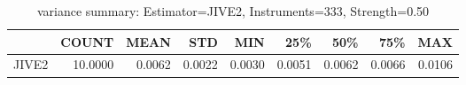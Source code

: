 \begin{table}[ht]
\centering
\caption{variance summary: Estimator=JIVE2, Instruments=333, Strength=0.50}
\begin{tabular}{lrrrrrrrr}
\toprule
 & COUNT & MEAN & STD & MIN & 25\% & 50\% & 75\% & MAX \\
\midrule
JIVE2 & 10.0000 & 0.0062 & 0.0022 & 0.0030 & 0.0051 & 0.0062 & 0.0066 & 0.0106 \\
\bottomrule
\end{tabular}
\end{table}
